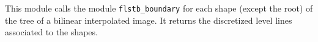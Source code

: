 This module calls the module \texttt{flstb\_boundary} for each shape (except the
root) of the tree of a bilinear interpolated image. It returns the discretized
level lines associated to the shapes.
